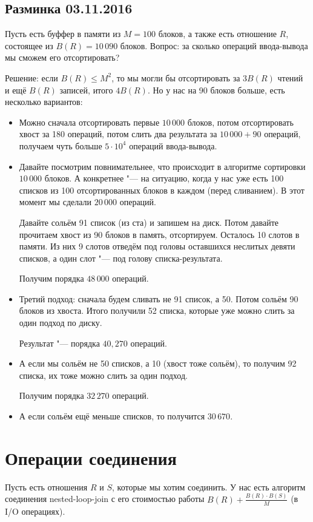 \subsection{Разминка 03.11.2016}

	Пусть есть буффер в памяти из $M=100$ блоков, а также есть отношение $R$,
	состоящее из $B(R)=10\,090$ блоков.
    Вопрос: за сколько операций ввода-вывода мы сможем его отсортировать?

    Решение: если $B(R) \le M^2$, то мы могли бы отсортировать за $3B(R)$
    чтений и ещё $B(R)$ записей, итого $4B(R)$.
    Но у нас на 90 блоков больше, есть несколько вариантов:
    \begin{itemize}
    	\item
    		Можно сначала отсортировать первые $10\,000$ блоков,
    		потом отсортировать хвост за 180 операций, 
    		потом слить два результата за $10\,000+90$ операций,
    		получаем чуть больше $5\cdot 10^4$ операций ввода-вывода.
		\item
			Давайте посмотрим повнимательнее, что происходит
			в алгоритме сортировки $10\,000$ блоков.
			А конкретнее "--- на ситуацию, когда у нас уже
			есть 100 списков из 100 отсортированных блоков в каждом
			(перед сливанием).
			В этот момент мы сделали $20\,000$ операций.

			Давайте сольём 91 список (из ста) и запишем на диск.
			Потом давайте прочитаем хвост из 90 блоков в память, отсортируем.
           	Осталось 10 слотов в памяти.
			Из них 9 слотов отведём под головы оставшихся неслитых девяти списков,
			а один слот "--- под голову списка-результата.

			Получим порядка $48\,000$ операций.
		\item
			Третий подход: сначала будем сливать не 91 список, а 50.
			Потом сольём 90 блоков из хвоста.
			Итого получили 52 списка, которые уже можно слить за один подход по диску.

			Результат "--- порядка $40,270$ операций.
		\item
			А если мы сольём не 50 списков, а 10 (хвост тоже сольём), то получим 92 списка,
			их тоже можно слить за один подход.

			Получим порядка $32\,270$ операций.
		\item
			А если сольём ещё меньше списков, то получится $30\,670$.
    \end{itemize}

\section{Операции соединения}
	Пусть есть отношения $R$ и $S$, которые мы хотим соединить.
	У нас есть алгоритм соединения nested-loop-join с его стоимостью работы $B(R) + \frac{B(R)\cdot B(S)}{M}$ (в I/O операциях).


